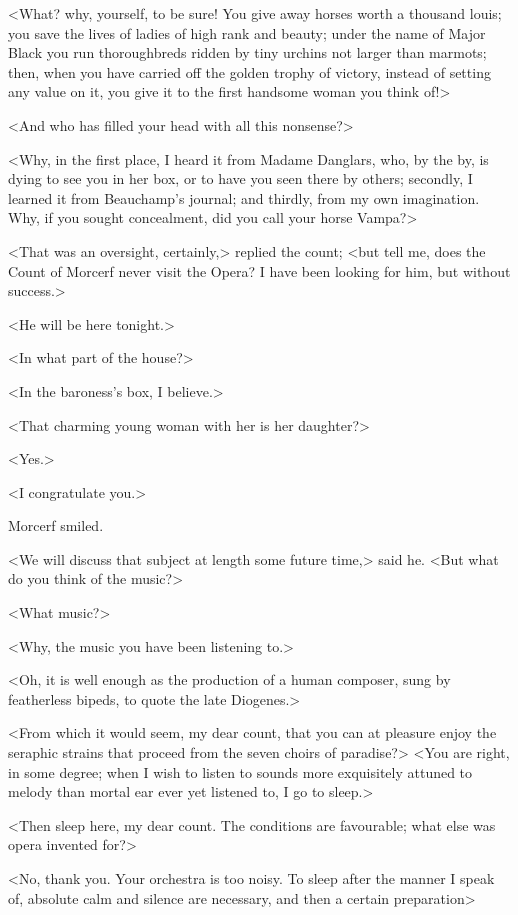 <What? why, yourself, to be sure! You give away horses worth a thousand louis; you save the lives of ladies of high rank and beauty; under the name of Major Black you run thoroughbreds ridden by tiny urchins not larger than marmots; then, when you have carried off the golden trophy of victory, instead of setting any value on it, you give it to the first handsome woman you think of!> 

 <And who has filled your head with all this nonsense?> 

 <Why, in the first place, I heard it from Madame Danglars, who, by the by, is dying to see you in her box, or to have you seen there by others; secondly, I learned it from Beauchamp's journal; and thirdly, from my own imagination. Why, if you sought concealment, did you call your horse Vampa?> 

 <That was an oversight, certainly,> replied the count; <but tell me, does the Count of Morcerf never visit the Opera? I have been looking for him, but without success.> 

 <He will be here tonight.> 

 <In what part of the house?> 

 <In the baroness's box, I believe.> 

 <That charming young woman with her is her daughter?> 

 <Yes.> 

 <I congratulate you.> 

 Morcerf smiled. 

 <We will discuss that subject at length some future time,> said he. <But what do you think of the music?> 

 <What music?> 

 <Why, the music you have been listening to.> 

 <Oh, it is well enough as the production of a human composer, sung by featherless bipeds, to quote the late Diogenes.> 

 <From which it would seem, my dear count, that you can at pleasure enjoy the seraphic strains that proceed from the seven choirs of paradise?>  <You are right, in some degree; when I wish to listen to sounds more exquisitely attuned to melody than mortal ear ever yet listened to, I go to sleep.> 

 <Then sleep here, my dear count. The conditions are favourable; what else was opera invented for?> 

 <No, thank you. Your orchestra is too noisy. To sleep after the manner I speak of, absolute calm and silence are necessary, and then a certain preparation\longdash> 

